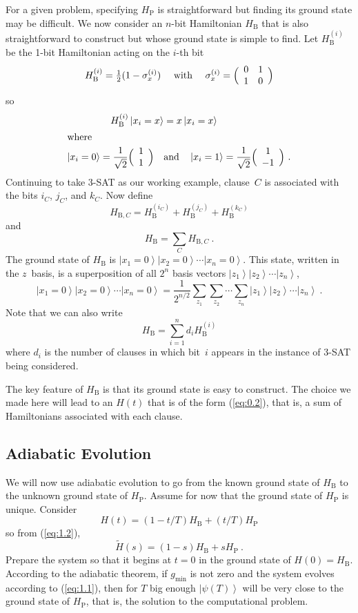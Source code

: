\documentclass[twoside]{article}
\newcommand{\half}{{\textstyle{\frac12}}}
\newcommand{\ket}[1]{\left|#1\right\rangle}
\newcommand{\numEq}[2]{\begin{equation}
   \label{eq:#1}
   #2\end{equation}}
\newcommand{\refEq}[1]{(\ref{eq:#1})}
\newcommand{\rP}{{\mathrm{P}}}
\newcommand{\rB}{{\mathrm{B}}}
\newcommand{\gm}{g_{\min}}
\let\tilde\widetilde
\numberwithin{equation}{section}
\begin{document}
For a given problem, specifying $H_\rP$ is straightforward but finding its
ground state may be difficult. We now consider an $n$-bit Hamiltonian
$H_\rB$ that is also straightforward to construct but whose ground state is
simple to find. Let
 $ H_\rB^{(i)}$ be the 1-bit Hamiltonian acting on the $i$-th bit
\numEq{1.16}{
 H_\rB^{(i)} = \half (1-\sigma_x^{(i)})\quad \mbox{ with }\quad
\sigma_x^{(i)} = \Bigl(\begin{array}{cc}0 & 1\\1 & 0\end{array}\Bigr) } so
\begin{align}
 H_\rB^{(i)} \ket{x_i=x} &= x\ket{x_i=x} \nonumber\\
\intertext{where}
 \ket{x_i=0} = \frac1{\sqrt2}\Bigl(\begin{array}{c}1\\1 \end{array}\Bigr)
\quad   &\mbox{and}\quad \ket{x_i=1} =
\frac1{\sqrt2}\Bigl(\begin{array}{c}1\\-1
\end{array}\Bigr)\ . \label{eq:1.17}
\end{align} 
Continuing to take 3-SAT as our working example,
clause~$C$ is associated with the bits $i_C$,
$j_C$, and $k_C$. Now define
\numEq{2.19}{ H_{\rB, C} = H_\rB^{(i_C)} + H_\rB^{(j_C)} + H_\rB^{(k_C)}   }
and 
\numEq{2.20}{ H_\rB = \sum_C H_{\rB, C}\ . }
 The ground state of $H_\rB$ is $ \ket{x_1=0} \ket{x_2=0}\cdots
\ket{x_n=0}$. This state, written in the $z$~basis, is a superposition of all
$2^n$ basis vectors $\ket{z_1}\ket{z_2}\cdots\ket{z_n}$, 
\numEq{1.18new}{
\ket{x_1=0}\ket{x_2=0} \cdots\ket{x_n=0}=
\frac1{2^{n/2}} \sum_{z_1}\sum_{z_2}\cdots\sum_{z_n}
\ket{z_1}\ket{z_2}\cdots\ket{z_n}\ . } Note that we can also write
\numEq{2.21}{ H_\rB = \sum_{i=1}^n d_i H_\rB^{(i)} } where $d_i$ is the
number of clauses in which bit~$i$ appears in the instance of 3-SAT being
considered. 

The key feature of $H_\rB$ is that its ground state is easy to construct. The
choice we made here will lead to an $H(t)$ that is of the form \refEq{0.2},
that is, a sum of Hamiltonians associated with each clause. 

\subsection{Adiabatic Evolution} We will now use adiabatic evolution to go
from the known ground state of
$H_\rB$ to the unknown ground state of $H_\rP$. Assume for now that the
ground state of $H_\rP$ is unique. Consider
\numEq{1.18}{ H(t) = (1-t/T) H_\rB + (t/T) H_\rP } so from \refEq{1.2},
\numEq{1.19}{
\tilde H(s) = (1-s) H_\rB +  s H_\rP\ . } Prepare the system so that  it
begins at $t=0$ in the ground state of
$H(0)=H_\rB$. According to the adiabatic theorem, if $\gm$ is not zero and
the system evolves according to \refEq{1.1}, then for   $T$ big enough
$\ket{\psi(T)}$ will be very close to the ground state of
$H_\rP$, that is, the solution to the computational problem. 
\end{document}
